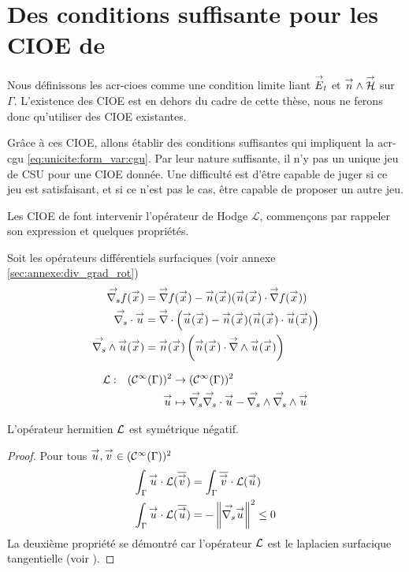 \section[Des CSU pour les CIOE de Stupfel et Poget 2011]{Des conditions suffisante pour les CIOE de \cite{stupfel_sufficient_2011}}

  Nous définissons les \glspl{acr-cioe} comme une condition limite liant \(\vE_t\) et \(\vn\pvect\vH\) sur \(\Gamma\). L'existence des CIOE est en dehors du cadre de cette thèse, nous ne ferons donc qu'utiliser des CIOE existantes.

  Grâce à ces CIOE,   allons établir des conditions suffisantes qui impliquent la \gls{acr-cgu} \eqref{eq:unicite:form_var:cgu}. Par leur nature suffisante, il n'y pas un unique jeu de CSU pour une CIOE donnée. Une difficulté est d'être capable de juger si ce jeu est satisfaisant, et si ce n'est pas le cas, être capable de proposer un autre jeu.

  Les CIOE de \cite{stupfel_sufficient_2011} font intervenir l'opérateur de Hodge \(\mathcal{L}\), commençons par rappeler son expression et quelques propriétés.

  Soit les opérateurs différentiels surfaciques (voir annexe \ref{sec:annexe:div_grad_rot})
  \begin{align*}
        \vgrads{f}(\vx) &= \vgrad{f}(\vx) - \vn(\vx) (\vn(\vx) \cdot \vgrad{f}(\vx))
        \\
        \vdivs{\vu} &= \vdiv\left(\vu(\vx) - \vn(\vx) (\vn(\vx) \cdot \vu(\vx)\right)
        \\
        \vrots{\vu}(\vx) &= \vn(\vx)\left(\vn(\vx) \cdot \vrot{\vu}(\vx)\right)
    \end{align*}

  \begin{defn}
    \label{def:operator:L}
    \begin{equation*}
        \fonction{\LL}{(\mathcal{C}^\infty(\Gamma))^2}{(\mathcal{C}^\infty(\Gamma))^2}%
          {\vu}{\vgrads{\vdivs \vu} - \vrots{\vrots \vu}}
    \end{equation*}
  \end{defn}

  \begin{prop}
    \label{eq:hodge:negatif}
    L’opérateur hermitien \(\LL\) est symétrique négatif.
  \end{prop}

  \begin{proof}
    Pour tous \(\vu,\vv \in (\mathcal C^\infty(\Gamma))^2\)
    \begin{align*}
      \int_\Gamma \vu\cdot \LL(\conj{\vv}) &= \int_\Gamma \conj{\vv}\cdot \LL(\vu)
      \\
      \int_\Gamma \vu\cdot \LL(\conj{\vu}) &= -\norm{\vgrads{\vu}}^2 \le 0
    \end{align*}
    La deuxième propriété se démontré car l'opérateur \(\LL\) est le laplacien surfacique tangentielle (voir \cite[p.~1028]{bladel_electromagnetic_2007}).
  \end{proof}


